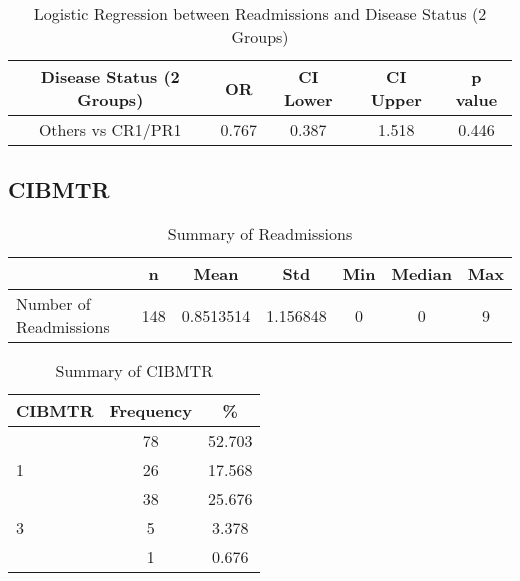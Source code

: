 \documentclass[12pt,]{article}
\begin{document}
\pagebreak

\begin{table}[!h]

\caption{\label{tab:unnamed-chunk-40}Logistic Regression between Readmissions and Disease Status (2 Groups)}
\centering
\begin{tabular}{ccccc}
\toprule
Disease Status (2 Groups) & OR & CI Lower & CI Upper & p value\\
\midrule
\rowcolor{white}  Others vs CR1/PR1 & 0.767 & 0.387 & 1.518 & 0.446\\
\bottomrule
\end{tabular}
\end{table}

\pagebreak 

\subsection{CIBMTR}\label{cibmtr}

\begin{table}[!h]

\caption{\label{tab:unnamed-chunk-41}Summary of Readmissions}
\centering
\begin{tabular}{>{\raggedright\arraybackslash}p{5cm}cccccc}
\toprule
  & n & Mean & Std & Min & Median & Max\\
\midrule
\rowcolor{white}  Number of Readmissions & 148 & 0.8513514 & 1.156848 & 0 & 0 & 9\\
\bottomrule
\end{tabular}
\end{table}

\begin{table}[!h]

\caption{\label{tab:unnamed-chunk-41}Summary of CIBMTR}
\centering
\begin{tabular}{>{\centering\arraybackslash}p{5cm}cc}
\toprule
CIBMTR & Frequency & \%\\
\midrule
0 & 78 & 52.703\\
\rowcolor[HTML]{E3E5E7}  1 & 26 & 17.568\\
2 & 38 & 25.676\\
\rowcolor[HTML]{E3E5E7}  3 & 5 & 3.378\\
9 & 1 & 0.676\\
\bottomrule
\end{tabular}
\end{table}
\end{document}
